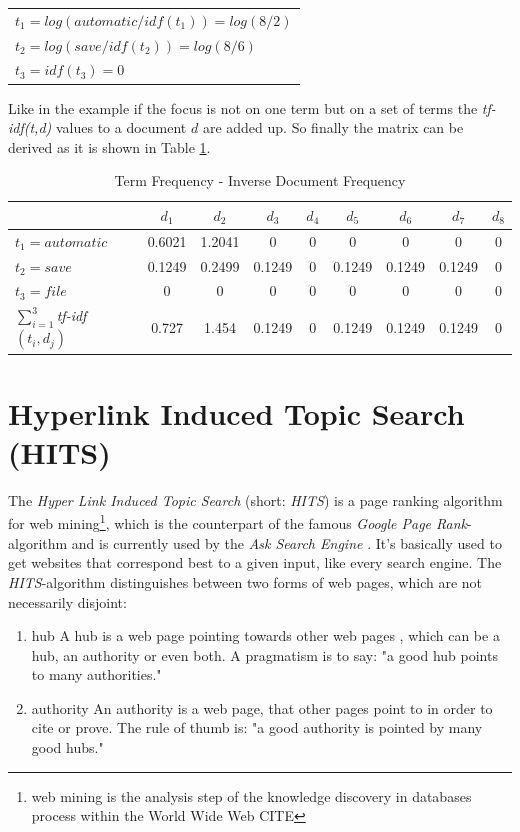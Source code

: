 \begin{table}[h]
  \centering
  \begin{tabular}{l}
    $t_1 = log(automatic / idf(t_1)) = log(8/2)$  \\
    $t_2 = log(save / idf(t_2))=log(8/6)$ \\
    $t_3 = idf(t_3)=0$ 
 \end{tabular}
\end{table}

Like in the example if the focus is not on one term but on a set of terms the \emph{tf-idf(t,d)} values to a document $d$ are added up. So finally the matrix can be derived as it is shown in Table \ref{table:tfidf_table}.

\begin{table}[h]
  \centering
  \begin{tabular}{| l | c | c | c | c | c | c | c | c |}
    \hline
    & $d_1$ & $d_2$ & $d_3$ & $d_4$ & $d_5$ & $d_6$ & $d_7$ & $d_8$ \\ \hline
    $t_1 = automatic$ & 0.6021 & 1.2041 & 0 & 0 & 0 & 0 & 0 & 0 \\ \hline
    $t_2 = save$ & 0.1249 & 0.2499 & 0.1249 &0 & 0.1249 & 0.1249 & 0.1249 & 0 \\ \hline
    $t_3 = file $ & 0 & 0 & 0 & 0 & 0 & 0 & 0 & 0 \\ \hline \hline
    $\sum\nolimits_{i=1}^3$\emph{tf-idf}$(t_i,d_j)$ & 0.727 & 1.454 & 0.1249 & 0 & 0.1249 & 0.1249 & 0.1249 & 0\\ \hline
  \end{tabular}
  \caption{Term Frequency - Inverse Document Frequency}
  \label{table:tfidf_table}
\end{table}

\section{Hyperlink Induced Topic Search (HITS)}
\label{sec:HITS}
The \emph{Hyper Link Induced Topic Search} (short: \emph{HITS}) is a page ranking algorithm for web mining\footnote{web mining is the analysis step of the knowledge discovery in databases process within the World Wide Web CITE}, which is the counterpart of the famous \emph{Google Page Rank}-algorithm and is currently used by the \emph{Ask Search Engine} \cite{wiki:HITS}. It's basically used to get websites that correspond best to a given input, like every search engine. 
The \emph{HITS}-algorithm distinguishes between two forms of web pages, which are not necessarily disjoint:
\begin{enumerate}
  \item hub \newline
  A hub is a web page pointing towards other web pages , which can be a hub, an authority or even both. A pragmatism is to say: "a good hub points to many authorities."
  \item authority \newline
  An authority is a web page, that other pages point to in order to cite or prove. The rule of thumb is: "a good authority is pointed by many good hubs."
\end{enumerate}

